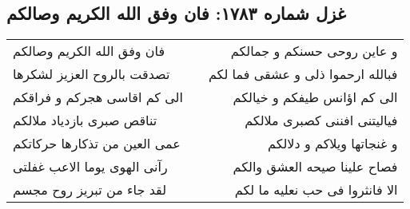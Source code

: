 \begin{center}
\section*{غزل شماره ۱۷۸۳: فان وفق الله الکریم وصالکم}
\label{sec:1783}
\begin{longtable}{l p{0.5cm} r}
فان وفق الله الکریم وصالکم
&&
و عاین روحی حسنکم و جمالکم
\\
تصدقت بالروح العزیز لشکرها
&&
فبالله ارحموا ذلی و عشقی فما لکم
\\
الی کم اقاسی هجرکم و فراقکم
&&
الی کم اؤانس طیفکم و خیالکم
\\
تناقص صبری بازدیاد ملالکم
&&
فیالیتنی افننی کصبری ملالکم
\\
عمی العین من تذکارها حرکاتکم
&&
و غنجاتها ویلاکم و دلالکم
\\
رآنی الهوی یوما الاعب غفلتی
&&
فصاح علینا صیحه العشق والکم
\\
لقد جاء من تبریز روح مجسم
&&
الا فانثروا فی حب نعلیه ما لکم
\\
\end{longtable}
\end{center}
